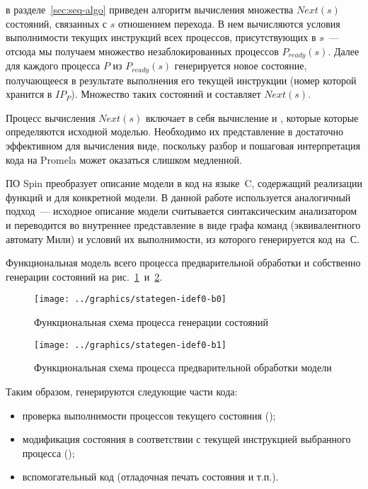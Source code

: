 в разделе~\ref{sec:seq-algo} приведен алгоритм вычисления множества $Next(s)$ состояний, связанных
с $s$ отношением перехода. В нем вычисляются условия выполнимости текущих инструкций всех
процессов, присутствующих в $s$~--- отсюда мы получаем множество незаблокированных
процессов $P_{ready}(s)$. Далее для каждого процесса $P$ из $P_{ready}(s)$ генерируется
новое состояние, получающееся в результате выполнения его текущей инструкции (номер
которой хранится в $IP_P$). Множество таких состояний и составляет $Next(s)$.

Процесс вычисления $Next(s)$ включает в себя вычисление  и ,
которые которые определяются исходной моделью. Необходимо их представление в достаточно
эффективном для вычисления виде, поскольку разбор и пошаговая интерпретация кода на
Promela может оказаться слишком медленной.

ПО Spin преобразует описание модели в код на языке~C, содержащий реализации функций
 и  для конкретной модели. В данной работе используется
аналогичный подход~--- исходное описание модели считывается синтаксическим анализатором и
переводится во внутреннее представление в виде графа команд (эквивалентного автомату Мили)
и условий их выполнимости, из которого генерируется код на~С.

Функциональная модель всего процесса предварительной обработки и собственно генерации
состояний на рис.~\ref{fig:idef0-codegen1}~и~\ref{fig:idef0-codegen2}.

\begin{figure}[ht]
  \centering
  \texttt{[image: ../graphics/stategen-idef0-b0]}
  \caption{Функциональная схема процесса генерации состояний}
\label{fig:idef0-codegen1}
\end{figure}

\begin{figure}[ht]
  \centering
  \texttt{[image: ../graphics/stategen-idef0-b1]}
  \caption{Функциональная схема процесса предварительной обработки модели}
\label{fig:idef0-codegen2}
\end{figure}

Таким образом, генерируются следующие части кода:

\begin{itemize}
\item проверка выполнимости процессов текущего состояния ();
\item модификация состояния в соответствии с текущей инструкцией выбранного процесса (); 
\item вспомогательный код (отладочная печать состояния и т.п.).
\end{itemize}

